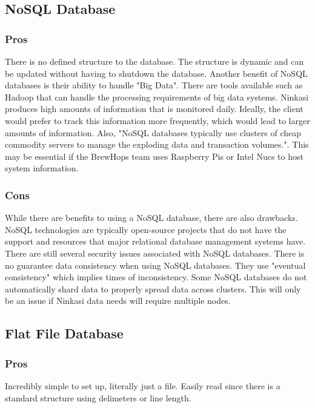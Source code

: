 \documentclass[draftclsnofoot,onecolumn,letterpaper,10pt,compsoc]{IEEEtran}
\begin{document}
        
	\subsection{NoSQL Database}
        \subsubsection{Pros}
            There is no defined structure to the database.
            The structure is dynamic and can be updated without having to shutdown the database\cite{MongoDBProsCons}.
            Another benefit of NoSQL databases is their ability to handle "Big Data".
            There are tools available such as Hadoop that can handle the processing requirements of big data systems\cite{NoSQLProsCons}.
            Ninkasi produces high amounts of information that is monitored daily.
            Ideally, the client would prefer to track this information more frequently, which would lead to larger amounts of information.
            Also, "NoSQL databases typically use clusters of cheap commodity servers to manage the exploding data and transaction volumes."\cite{NoSQLProsCons}.
            This may be essential if the BrewHops team uses Raspberry Pis or Intel Nucs to host system information.
            
    
        \subsubsection{Cons}
            While there are benefits to using a NoSQL database, there are also drawbacks.
            NoSQL technologies are typically open-source projects that do not have the support and resources that major relational database management systems have\cite{NoSQLProsCons}.
            There are still several security issues associated with NoSQL databases\cite{NoSQLSecurityIssues}.
            There is no guarantee data consistency when using NoSQL databases\cite{ChannelFutures}.
            They use "eventual consistency" which implies times of inconsistency.
            Some NoSQL databases do not automatically shard data to properly spread data across clusters\cite{ChannelFutures}.
            This will only be an issue if Ninkasi data needs will require multiple nodes.
        
        
	\subsection{Flat File Database}
        \subsubsection{Pros}
            Incredibly simple to set up, literally just a file.
            Easily read since there is a standard structure using delimeters or line length.
    
\end{document}
